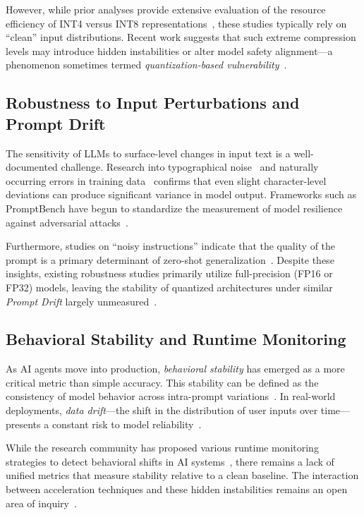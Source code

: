 \documentclass[conference]{IEEEtran}
\begin{document}
However, while prior analyses provide extensive evaluation of the resource efficiency of INT4 versus INT8 representations~\cite{ref9, ref1}, these studies typically rely on ``clean'' input distributions. Recent work suggests that such extreme compression levels may introduce hidden instabilities or alter model safety alignment—a phenomenon sometimes termed \textit{quantization-based vulnerability}~\cite{ref9}.

\subsection{Robustness to Input Perturbations and Prompt Drift}

The sensitivity of LLMs to surface-level changes in input text is a well-documented challenge. Research into typographical noise~\cite{ref11} and naturally occurring errors in training data~\cite{ref8} confirms that even slight character-level deviations can produce significant variance in model output. Frameworks such as PromptBench have begun to standardize the measurement of model resilience against adversarial attacks~\cite{ref5}. 

Furthermore, studies on ``noisy instructions'' indicate that the quality of the prompt is a primary determinant of zero-shot generalization~\cite{ref10}. Despite these insights, existing robustness studies primarily utilize full-precision (FP16 or FP32) models, leaving the stability of quantized architectures under similar \textit{Prompt Drift} largely unmeasured~\cite{ref4}.

\subsection{Behavioral Stability and Runtime Monitoring}

As AI agents move into production, \textit{behavioral stability} has emerged as a more critical metric than simple accuracy. This stability can be defined as the consistency of model behavior across intra-prompt variations~\cite{ref6}. In real-world deployments, \textit{data drift}—the shift in the distribution of user inputs over time—presents a constant risk to model reliability~\cite{ref7}. 

While the research community has proposed various runtime monitoring strategies to detect behavioral shifts in AI systems~\cite{ref12}, there remains a lack of unified metrics that measure stability relative to a clean baseline. The interaction between acceleration techniques and these hidden instabilities remains an open area of inquiry~\cite{ref9}.
\end{document}
